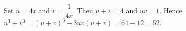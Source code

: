 Set $u=4x$ and $v=\dfrac{1}{4x}$. Then $u+v=4$ and $uv=1$. Hence $u^3+v^3=(u+v)^3-3uv(u+v)=64-12=\boxed{52}$.
